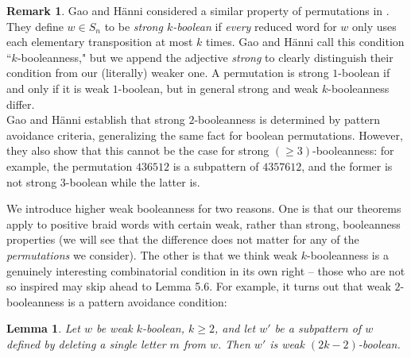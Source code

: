 \documentclass[11pt]{amsart}
\newtheorem{lem}[thm]{Lemma}
\theoremstyle{definition}
\newtheorem{rem}[thm]{Remark}
\theoremstyle{remark}
\numberwithin{equation}{section}
\begin{document}
\begin{rem}
    Gao and H\"anni considered a similar property of permutations in \cite{gao2020boolean}. They define $w \in S_n$ to be \textit{strong $k$-boolean} if \textit{every} reduced word for $w$ only uses each elementary transposition at most $k$ times. Gao and H\"anni call this condition ``$k$-booleanness," but we append the adjective \textit{strong} to clearly distinguish their condition from our (literally) weaker one. A permutation is strong $1$-boolean if and only if it is weak $1$-boolean, but in general strong and weak $k$-booleanness differ.\\
    
    Gao and H\"anni establish that strong $2$-booleanness is determined by pattern avoidance criteria, generalizing the same fact for boolean permutations. However, they also show that this cannot be the case for strong $(\geq 3)$-booleanness: for example, the permutation $436512$ is a subpattern of $4357612$, and the former is not strong $3$-boolean while the latter is.\end{rem}

    We introduce higher weak booleanness for two reasons. One is that our theorems apply to positive braid words with certain weak, rather than strong, booleanness properties (we will see that the difference does not matter for any of the \textit{permutations} we consider).
    The other is that we think weak $k$-booleanness is a genuinely interesting combinatorial condition in its own right -- those who are not so inspired may skip ahead to Lemma 5.6. For example, it turns out that weak $2$-booleanness is a pattern avoidance condition:
    
    \begin{lem}
        Let $w$ be weak $k$-boolean, $k \geq 2$, and let $w'$ be a subpattern of $w$ defined by deleting a single letter $m$ from $w$. Then $w'$ is weak $(2k - 2)$-boolean.
    \end{lem}
\end{document}
